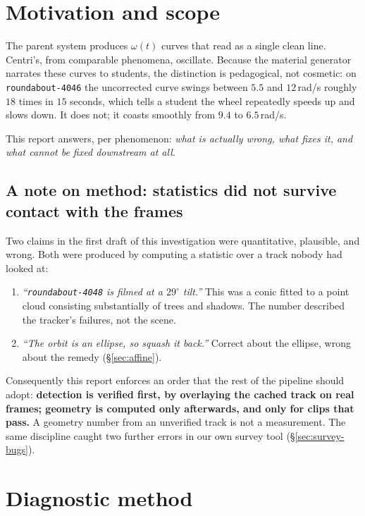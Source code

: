 \documentclass[11pt,a4paper]{article}
\begin{document}
\section{Motivation and scope}

The parent system produces $\omega(t)$ curves that read as a single clean line. Centri's, from
comparable phenomena, oscillate. Because the material generator narrates these curves to
students, the distinction is pedagogical, not cosmetic: on \texttt{roundabout-4046} the
uncorrected curve swings between $5.5$ and $12$\,rad/s roughly $18$ times in $15$ seconds,
which tells a student the wheel repeatedly speeds up and slows down. It does not; it coasts
smoothly from $9.4$ to $6.5$\,rad/s.

This report answers, per phenomenon: \emph{what is actually wrong, what fixes it, and what
cannot be fixed downstream at all.}

\subsection{A note on method: statistics did not survive contact with the frames}
\label{sec:method-note}

Two claims in the first draft of this investigation were quantitative, plausible, and wrong.
Both were produced by computing a statistic over a track nobody had looked at:

\begin{enumerate}
  \item \emph{``\texttt{roundabout-4048} is filmed at a $29^\circ$ tilt.''} This was a conic
  fitted to a point cloud consisting substantially of trees and shadows. The number described
  the tracker's failures, not the scene.
  \item \emph{``The orbit is an ellipse, so squash it back.''} Correct about the ellipse,
  wrong about the remedy (\S\ref{sec:affine}).
\end{enumerate}

Consequently this report enforces an order that the rest of the pipeline should adopt:
\textbf{detection is verified first, by overlaying the cached track on real frames; geometry is
computed only afterwards, and only for clips that pass.} A geometry number from an unverified
track is not a measurement. The same discipline caught two further errors in our own survey
tool (\S\ref{sec:survey-bugs}).

\section{Diagnostic method}
\end{document}
